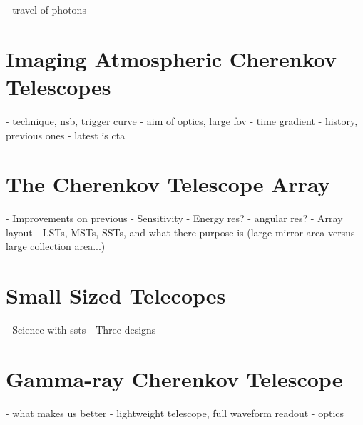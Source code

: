 - travel of photons

\section{Imaging Atmospheric Cherenkov Telescopes}

- technique, nsb, trigger curve
- aim of optics, large fov
- time gradient
- history, previous ones
- latest is cta

\section{The Cherenkov Telescope Array}

- Improvements on previous
- Sensitivity
- Energy res?
- angular res?
- Array layout
- LSTs, MSTs, SSTs, and what there purpose is (large mirror area versus large collection area...) 

\section{Small Sized Telecopes}

- Science with ssts
- Three designs

\section{Gamma-ray Cherenkov Telescope}

- what makes us better - lightweight telescope, full waveform readout
- optics








